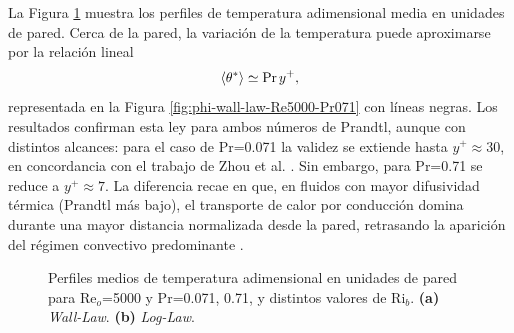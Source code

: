 La Figura \ref{fig:phi-plus-Re5000-Pr071} muestra los perfiles de temperatura adimensional media en unidades de pared. Cerca de la pared, la variación de la temperatura puede aproximarse por la relación lineal \cite{kawamura1998dns}
\begin{equation*}
\langle \theta^* \rangle \simeq \text{Pr}\hspace{0.5mm} y^+ ,
\end{equation*}
representada en la Figura \ref{fig:phi-wall-law-Re5000-Pr071} con líneas negras. Los resultados confirman esta ley para ambos números de Prandtl, aunque con distintos alcances: para el caso de Pr=0.071 la validez se extiende hasta $y^{+}\approx 30$, en concordancia con el trabajo de Zhou et al. \cite{zhou2024direct}. Sin embargo, para Pr=0.71 se reduce a $y^{+}\approx 7$. La diferencia recae en que, en fluidos con mayor difusividad térmica (Prandtl más bajo), el transporte de calor por conducción domina durante una mayor distancia normalizada desde la pared, retrasando la aparición del régimen convectivo predominante \cite{abregu2023dns}.

\begin{figure}[H]
  \centering
    \caption{Perfiles medios de temperatura adimensional en unidades de pared para Re$_o$=5000 y Pr=0.071, 0.71, y distintos valores de Ri$_b$. \textbf{(a)} \textit{Wall-Law}. \textbf{(b)} \textit{Log-Law}.}
    \label{fig:phi-plus-Re5000-Pr071}
\end{figure}

